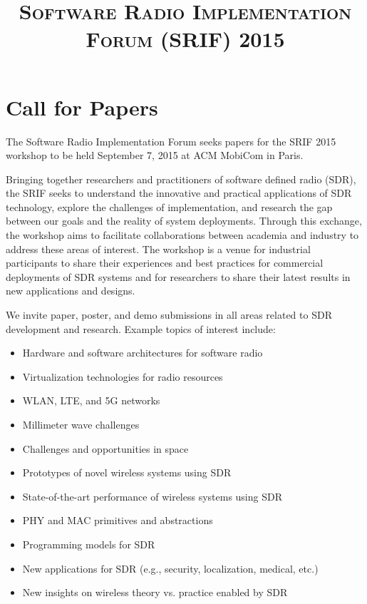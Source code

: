 \documentclass[11pt]{article}
\title{\textsc{\textbf{Software Radio Implementation Forum (SRIF) 2015}}}
\begin{document}
\maketitle


\section{Call for Papers}

The Software Radio Implementation Forum seeks papers for the SRIF 2015
workshop to be held September 7, 2015 at ACM MobiCom in Paris.

Bringing together researchers and practitioners of software defined
radio (SDR), the SRIF seeks to understand the innovative and practical
applications of SDR technology, explore the challenges of
implementation, and research the gap between our goals and the reality
of system deployments. Through this exchange, the workshop aims to
facilitate collaborations between academia and industry to address
these areas of interest. The workshop is a venue for industrial
participants to share their experiences and best practices for
commercial deployments of SDR systems and for researchers to share
their latest results in new applications and designs.

We invite paper, poster, and demo submissions in all areas related to
SDR development and research. Example topics of interest include:

\begin{itemize}
\item Hardware and software architectures for software radio
\item Virtualization technologies for radio resources
\item WLAN, LTE, and 5G networks
\item Millimeter wave challenges
\item Challenges and opportunities in space
\item Prototypes of novel wireless systems using SDR
\item State-of-the-art performance of wireless systems using SDR
\item PHY and MAC primitives and abstractions
\item Programming models for SDR
\item New applications for SDR (e.g., security, localization, medical, etc.)
\item New insights on wireless theory vs. practice enabled by SDR
\end{itemize}
\end{document}
